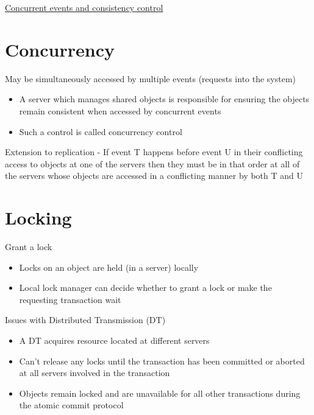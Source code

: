 \documentclass{article}[18pt]
\begin{document}
\begin{center}
\underline{\huge Concurrent events and consistency control}
\end{center}
\section{Concurrency}
\begin{definition}
May be simultaneously accessed by multiple events (requests into the system)
\end{definition}
\begin{itemize}
	\item A server which manages shared objects is responsible for ensuring the objects remain consistent when accessed by concurrent events
	\item Such a control is called concurrency control
\end{itemize}
Extension to replication - If event T happens before event U in their conflicting access to objects at one of the servers then they must be in that order at all of the servers whose objects are accessed in a conflicting manner by both T and U
\section{Locking}
Grant a lock
\begin{itemize}
	\item Locks on an object are held (in a server) locally
	\item Local lock manager can decide whether to grant a lock or make the requesting transaction wait
\end{itemize}
Issues with Distributed Transmission (DT)
\begin{itemize}
	\item A DT acquires resource located at different servers
	\item Can't release any locks until the transaction has been committed or aborted at all servers involved in the transaction
	\item Objects remain locked and are unavailable for all other transactions during the atomic commit protocol
\end{itemize}
\end{document}
